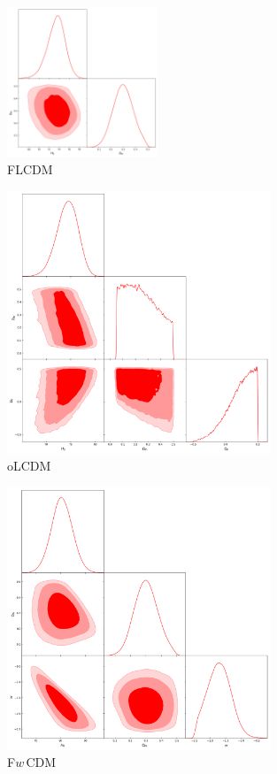 \documentclass{cosmo}
\begin{document}
    \begin{figure}[h]
        \centering
        \includegraphics[width=0.4\textwidth]{H0LiCOW-FLCDM-allN.png}
        \caption{FLCDM}
        \label{fig10}
    \end{figure}
    \begin{figure}[h]
        \centering
        \includegraphics[width=0.7\textwidth]{H0LiCOW-oLCDM-allN.png}
        \caption{oLCDM}
        \label{fig11}
    \end{figure}
    \begin{figure}[h]
        \centering
        \includegraphics[width=0.7\textwidth]{H0LiCOW-FwCDM-allN.png}
        \caption{F$w\,$CDM}
        \label{fig12}
    \end{figure}
\end{document}
